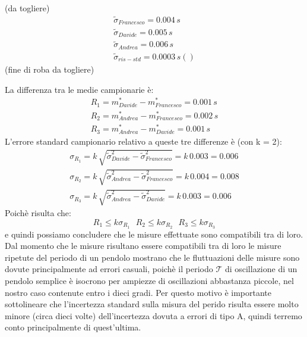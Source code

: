(da togliere)
\begin{equation*}
	\begin{split}
		\tilde{\sigma}_{Francesco} = 0.004\,s \\
		\tilde{\sigma}_{Davide} = 0.005\,s \\
		\tilde{\sigma}_{Andrea} = 0.006\,s \\
		\tilde{\sigma}_{ris-std} = 0.0003\,s ()
	\end{split}
\end{equation*} (fine di roba da togliere)

La differenza tra le medie campionarie è:
\begin{equation}
\begin{split}
	R_{1} = m_{Davide}^* - m_{Francesco}^* = 0.001\,s \\
	R_{2} = m_{Andrea}^* - m_{Francesco}^* = 0.002\,s \\
	R_{3} = m_{Andrea}^* - m_{Davide}^* = 0.001\,s
\end{split}
\end{equation}
L'errore standard campionario relativo a queste tre differenze è (con k = 2):
\begin{equation}
\begin{split}
	\sigma_{R_{1}} = k\,\sqrt{\tilde{\sigma}^2_{Davide} - \tilde{\sigma}^2_{Francesco}} = k\,0.003 = 0.006\\
	\sigma_{R_{2}} = k\,\sqrt{\tilde{\sigma}^2_{Andrea} - \tilde{\sigma}^2_{Francesco}} = k\,0.004 = 0.008\\
	\sigma_{R_{3}} = k\,\sqrt{\tilde{\sigma}^2_{Andrea} - \tilde{\sigma}^2_{Davide}} = k\,0.003 = 0.006
\end{split}
\end{equation}
Poichè risulta che:
\begin{equation}
	R_{1}\leq{k\sigma_{R_{1}}}\,\,\,\,R_{2}\leq{k\sigma_{R_{2}}}\,\,\,\,R_{3}\leq{k\sigma_{R_{3}}}
\end{equation}
e quindi possiamo concludere che le misure effettuate sono compatibili tra di loro.\\
 
Dal momento che le misure risultano essere compatibili tra di loro le misure
ripetute del periodo di un pendolo mostrano che le fluttuazioni delle misure
sono dovute principalmente ad errori casuali, poichè il periodo
$\mathcal{T}$ di oscillazione di un pendolo semplice è isocrono per ampiezze
di oscillazioni abbastanza piccole, nel nostro caso contenute entro i dieci gradi.
Per questo motivo è importante sottolineare che l'incertezza standard sulla
misura del perido risulta essere molto minore (circa dieci volte) dell'incertezza
dovuta a errori di tipo A, quindi terremo conto principalmente di quest'ultima.

